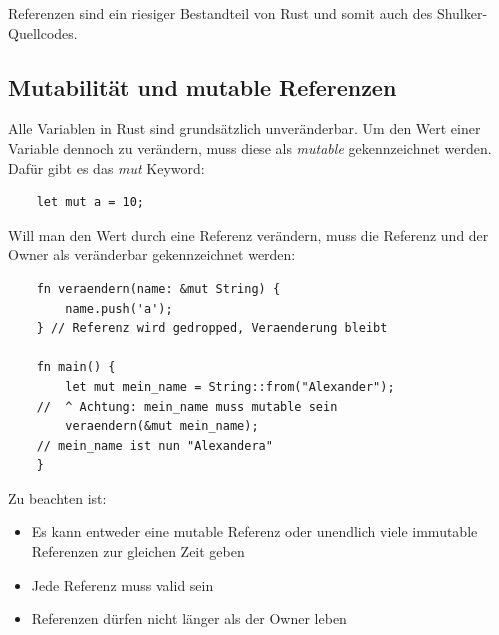 Referenzen sind ein riesiger Bestandteil von Rust und somit auch des Shulker-Quellcodes.

\subsection{Mutabilität und mutable Referenzen}
Alle Variablen in Rust sind grundsätzlich unveränderbar. Um den Wert einer Variable dennoch zu verändern,
muss diese als \textit{mutable} gekennzeichnet werden. Dafür gibt es das \textit{mut} Keyword:
\begin{lstlisting}
    let mut a = 10;
\end{lstlisting}
Will man den Wert durch eine Referenz verändern, muss die Referenz und der Owner als veränderbar gekennzeichnet werden:
\begin{lstlisting}
    fn veraendern(name: &mut String) {
        name.push('a');
    } // Referenz wird gedropped, Veraenderung bleibt

    fn main() {
        let mut mein_name = String::from("Alexander");
    //  ^ Achtung: mein_name muss mutable sein
        veraendern(&mut mein_name);
    // mein_name ist nun "Alexandera"
    }
\end{lstlisting}
Zu beachten ist:
\begin{itemize}
    \item Es kann entweder eine mutable Referenz oder unendlich viele immutable Referenzen zur gleichen Zeit geben
    \item Jede Referenz muss valid sein
    \item Referenzen dürfen nicht länger als der Owner leben
\end{itemize}